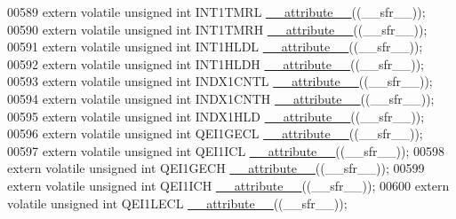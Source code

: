 \begin{DoxyCode}
00589 \textcolor{keyword}{extern} \textcolor{keyword}{volatile} \textcolor{keywordtype}{unsigned} \textcolor{keywordtype}{int}  INT1TMRL \hyperlink{a00015_a493c46f03454991ccc5aa7a6e1dfb2a7}{\_\_attribute\_\_}((\_\_sfr\_\_));
00590 \textcolor{keyword}{extern} \textcolor{keyword}{volatile} \textcolor{keywordtype}{unsigned} \textcolor{keywordtype}{int}  INT1TMRH \hyperlink{a00015_a493c46f03454991ccc5aa7a6e1dfb2a7}{\_\_attribute\_\_}((\_\_sfr\_\_));
00591 \textcolor{keyword}{extern} \textcolor{keyword}{volatile} \textcolor{keywordtype}{unsigned} \textcolor{keywordtype}{int}  INT1HLDL \hyperlink{a00015_a493c46f03454991ccc5aa7a6e1dfb2a7}{\_\_attribute\_\_}((\_\_sfr\_\_));
00592 \textcolor{keyword}{extern} \textcolor{keyword}{volatile} \textcolor{keywordtype}{unsigned} \textcolor{keywordtype}{int}  INT1HLDH \hyperlink{a00015_a493c46f03454991ccc5aa7a6e1dfb2a7}{\_\_attribute\_\_}((\_\_sfr\_\_));
00593 \textcolor{keyword}{extern} \textcolor{keyword}{volatile} \textcolor{keywordtype}{unsigned} \textcolor{keywordtype}{int}  INDX1CNTL \hyperlink{a00015_a493c46f03454991ccc5aa7a6e1dfb2a7}{\_\_attribute\_\_}((\_\_sfr\_\_));
00594 \textcolor{keyword}{extern} \textcolor{keyword}{volatile} \textcolor{keywordtype}{unsigned} \textcolor{keywordtype}{int}  INDX1CNTH \hyperlink{a00015_a493c46f03454991ccc5aa7a6e1dfb2a7}{\_\_attribute\_\_}((\_\_sfr\_\_));
00595 \textcolor{keyword}{extern} \textcolor{keyword}{volatile} \textcolor{keywordtype}{unsigned} \textcolor{keywordtype}{int}  INDX1HLD \hyperlink{a00015_a493c46f03454991ccc5aa7a6e1dfb2a7}{\_\_attribute\_\_}((\_\_sfr\_\_));
00596 \textcolor{keyword}{extern} \textcolor{keyword}{volatile} \textcolor{keywordtype}{unsigned} \textcolor{keywordtype}{int}  QEI1GECL \hyperlink{a00015_a493c46f03454991ccc5aa7a6e1dfb2a7}{\_\_attribute\_\_}((\_\_sfr\_\_));
00597 \textcolor{keyword}{extern} \textcolor{keyword}{volatile} \textcolor{keywordtype}{unsigned} \textcolor{keywordtype}{int}  QEI1ICL \hyperlink{a00015_a493c46f03454991ccc5aa7a6e1dfb2a7}{\_\_attribute\_\_}((\_\_sfr\_\_));
00598 \textcolor{keyword}{extern} \textcolor{keyword}{volatile} \textcolor{keywordtype}{unsigned} \textcolor{keywordtype}{int}  QEI1GECH \hyperlink{a00015_a493c46f03454991ccc5aa7a6e1dfb2a7}{\_\_attribute\_\_}((\_\_sfr\_\_));
00599 \textcolor{keyword}{extern} \textcolor{keyword}{volatile} \textcolor{keywordtype}{unsigned} \textcolor{keywordtype}{int}  QEI1ICH \hyperlink{a00015_a493c46f03454991ccc5aa7a6e1dfb2a7}{\_\_attribute\_\_}((\_\_sfr\_\_));
00600 \textcolor{keyword}{extern} \textcolor{keyword}{volatile} \textcolor{keywordtype}{unsigned} \textcolor{keywordtype}{int}  QEI1LECL \hyperlink{a00015_a493c46f03454991ccc5aa7a6e1dfb2a7}{\_\_attribute\_\_}((\_\_sfr\_\_));

\end{DoxyCode}

